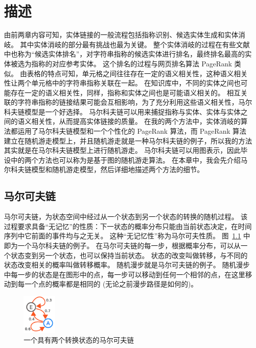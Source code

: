 \chapter{描述}\label{description}

由前两章内容可知，实体链接的一般流程包括指称识别、候选实体生成和实体消岐。
其中实体消岐的部分最有挑战也最为关键。
整个实体消岐的过程在有些文献\cite{shen2015entity}中也称为``候选实体排名''，对字符串指称的候选实体进行排名，最终排名最高的实体被选为指称的对应参考实体。
这个排名的过程与网页排名算法 PageRank\cite{page1999pagerank} 类似。
由表格的特点可知，单元格之间往往存在一定的语义相关性，这种语义相关性让两个单元格中的字符串指称关联在一起。
在知识库中，不同的实体之间也可能存在一定的语义相关性，同样，指称和实体之间也是可能语义相关的。
相互关联的字符串指称的链接结果可能会互相影响，为了充分利用这些语义相关性，马尔科夫链模型\cite{stewart1994introduction}是一个好选择。
马尔科夫链可以用来捕捉指称与实体、实体与实体之间的语义相关性，从而提高实体链接的质量。
在我的两个方法中，实体消岐的算法都运用了马尔科夫链模型和一个个性化的 PageRank 算法\cite{haveliwala2003topic}\cite{langville2011google}，而 PageRank 算法建立在随机游走模型上\cite{haveliwala2003topic}，并且随机游走就是一种马尔科夫链的例子，所以我的方法其实就是在马尔科夫链模型上进行随机游走。
马尔科夫链可以用图表示，因此毕设中的两个方法也可以称为是基于图的随机游走算法。
在本章中，我会先介绍马尔科夫链模型和随机游走模型，然后详细地描述两个方法的细节。


\section{马尔可夫链}
马尔可夫链，为状态空间中经过从一个状态到另一个状态的转换的随机过程。
该过程要求具备``无记忆''的性质：下一状态的概率分布只能由当前状态决定，在时间序列中它前面的事件均与之无关。
这种``无记忆性''称为马尔可夫性质。
图~\ref{markov_chain} 中即为一个马尔科夫链的例子。
在马尔可夫链的每一步，根据概率分布，可以从一个状态变到另一个状态，也可以保持当前状态。
状态的改变叫做转移，与不同的状态改变相关的概率叫做转移概率。
随机漫步就是马尔可夫链的例子。
随机漫步中每一步的状态是在图形中的点，每一步可以移动到任何一个相邻的点，在这里移动到每一个点的概率都是相同的 (无论之前漫步路径是如何的)。\par

\begin{figure}[htbp]
\centering
\includegraphics[width=0.15\textwidth]{img/markov_chain}
\caption{一个具有两个转换状态的马尔可夫链}
\label{markov_chain}
\end{figure}

